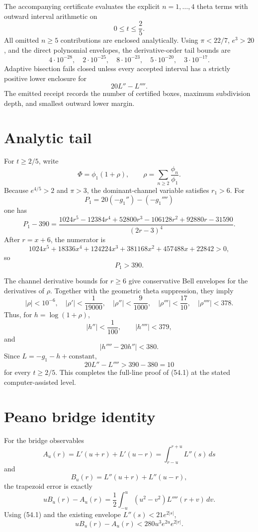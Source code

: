 The accompanying certificate evaluates the explicit $n=1,\ldots,4$ theta terms with outward interval arithmetic on
\[
 0\le t\le\frac25.
\]
All omitted $n\ge5$ contributions are enclosed analytically. Using $\pi<22/7$, $e^3>20$, and the direct polynomial envelopes, the derivative-order tail bounds are
\[
 4\cdot10^{-28},\quad
 2\cdot10^{-25},\quad
 8\cdot10^{-23},\quad
 5\cdot10^{-20},\quad
 3\cdot10^{-17}.
\]
Adaptive bisection fails closed unless every accepted interval has a strictly positive lower enclosure for
\[
 20L''-L''''.
\]
The emitted receipt records the number of certified boxes, maximum subdivision depth, and smallest outward lower margin.

\section{Analytic tail}

For $t\ge2/5$, write
\[
 \Phi=\phi_1(1+\rho),
 \qquad
 \rho=\sum_{n\ge2}\frac{\phi_n}{\phi_1}.
\]
Because $e^{4/5}>2$ and $\pi>3$, the dominant-channel variable satisfies $r_1>6$. For
\[
 P_1=20(-g_1'')-(-g_1'''')
\]
one has
\[
 P_1-390=
 \frac{1024r^5-12384r^4+52800r^3-106128r^2+92880r-31590}
 {(2r-3)^4}.
\]
After $r=x+6$, the numerator is
\[
 1024x^5+18336x^4+124224x^3+381168x^2+457488x+22842>0,
\]
so
\[
 \boxed{P_1>390}.
\]

The channel derivative bounds for $r\ge6$ give conservative Bell envelopes for the derivatives of $\rho$. Together with the geometric theta suppression, they imply
\[
 |\rho|<10^{-6},\quad
 |\rho'|<\frac1{19000},\quad
 |\rho''|<\frac9{1000},\quad
 |\rho'''|<\frac{17}{10},\quad
 |\rho''''|<378.
\]
Thus, for $h=\log(1+\rho)$,
\[
 |h''|<\frac1{100},
 \qquad
 |h''''|<379,
\]
and
\[
 |h''''-20h''|<380.
\]
Since $L=-g_1-h+\mathrm{constant}$,
\[
 \boxed{20L''-L''''>390-380=10}
\]
for every $t\ge2/5$. This completes the full-line proof of (54.1) at the stated computer-assisted level.

\section{Peano bridge identity}

For the bridge observables
\[
 A_u(r)=L'(u+r)+L'(u-r)
 =\int_{r-u}^{r+u}L''(s)\,ds
\]
and
\[
 B_u(r)=L''(u+r)+L''(u-r),
\]
the trapezoid error is exactly
\[
 \boxed{
 uB_u(r)-A_u(r)
 =\frac12\int_{-u}^{u}(u^2-v^2)L''''(r+v)\,dv.
 }
\]
Using (54.1) and the existing envelope $L''(s)<21e^{2|s|}$,
\[
 \boxed{
 uB_u(r)-A_u(r)
 <280u^3e^{2u}e^{2|r|}.
 }
\]

